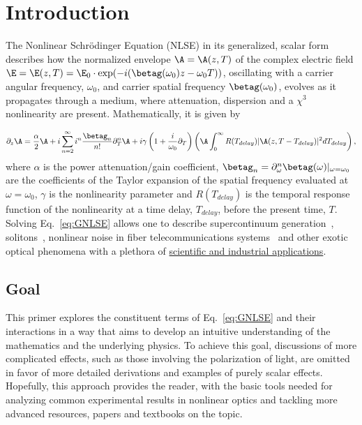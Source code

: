 \chapter{Introduction}
\label{ch:Introduction}
The Nonlinear Schr{\"o}dinger Equation (NLSE) in its generalized, scalar form describes how the normalized envelope $\A =\A(z,T)$ of the complex electric field $\E= \E(z,T) = \E_0\cdot \exp(-i(\betag(\omega_0)z-\omega_0T))$, oscillating with a carrier angular frequency, $\omega_0$, and carrier spatial frequency $\betag(\omega_0)$, evolves as it propagates through a medium, where attenuation, dispersion and a $\chi^{3}$ nonlinearity are present. Mathematically, it is given by

\begin{align}
    \label{eq:GNLSE}
    \partial_z \A = \frac{\alpha}{2}\A+i \sum_{n=2}^{\infty}i^n \frac{\betag_n}{n!}\partial_T^n\A  + i\gamma\left(1+\frac{i}{\omega_0}\partial_T  \right)\left( 
\A \int_{0}^{\infty} R(T_{delay})|\A(z,T-T_{delay})|^2 dT_{delay} \right),
\end{align}
where $\alpha$ is the power attenuation/gain coefficient, $\betag_n=\partial_\omega^n\betag(\omega)|_{\omega=\omega_0}$ are the coefficients of the Taylor expansion of the spatial frequency evaluated at $\omega = \omega_0$,  $\gamma$ is the nonlinearity parameter and $R(T_{delay})$ is the temporal response function of the nonlinearity at a time delay, $T_{delay}$, before the present time, $T$. Solving Eq.~\ref{eq:GNLSE} allows one to describe supercontinuum generation~\cite{supercontinuum_original_paper,NLSE_original}, solitons~\cite{soliton_first_theory,Soliton_experimental_first}, nonlinear noise in fiber telecommunications systems~\cite{poggiolini2014detailedanalyticalderivationgn} and other exotic optical phenomena with a plethora of \href{https://www.youtube.com/watch?v=cvVyBQ76IgU}{scientific and industrial applications}. 

\section{Goal}
This primer explores the constituent terms of Eq.~\ref{eq:GNLSE} and their interactions in a way that aims to develop an intuitive understanding of the mathematics and the underlying physics. To achieve this goal, discussions of more complicated effects, such as those involving the polarization of light, are omitted in favor of more detailed derivations and examples of purely scalar effects. Hopefully, this approach provides the reader, with the basic tools needed for analyzing common experimental results in nonlinear optics and tackling more advanced resources, papers and textbooks on the topic. 

